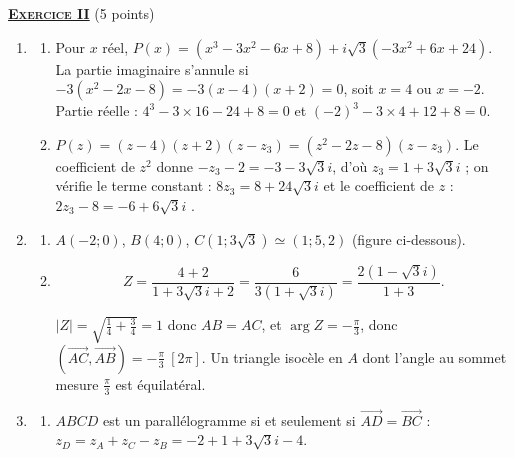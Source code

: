 \noindent \underline{\textsc{\textbf{Exercice II}}} (5 points)
	\begin{enumerate}
		\item \begin{enumerate}
			\item {}
				Pour $x$ réel,
				$P(x) = \left(x^3 - 3x^2 - 6x + 8\right) + i\sqrt{3}\left(-3x^2 + 6x + 24\right)$.
				La partie imaginaire s'annule si $-3(x^2 - 2x - 8) = -3(x-4)(x+2) = 0$, soit $x = 4$ ou $x = -2$.
				Partie réelle : $4^3 - 3\times16 - 24 + 8 = 0$ et $(-2)^3 - 3\times4 + 12 + 8 = 0$.

			\item {}
				$P(z) = (z-4)(z+2)(z - z_3) = (z^2 - 2z - 8)(z - z_3)$.
				Le coefficient de $z^2$ donne $-z_3 - 2 = -3 - 3\sqrt{3}i$, d'où $z_3 = 1 + 3\sqrt{3}i$ ;
				on vérifie le terme constant : $8z_3 = 8 + 24\sqrt{3}i$ \checkmark{} et le coefficient de $z$ :
				$2z_3 - 8 = -6 + 6\sqrt{3}i$ \checkmark.

		\end{enumerate}
		\item \begin{enumerate}
			\item {} $A(-2;0)$, $B(4;0)$, $C\left(1;3\sqrt{3}\right) \simeq (1;5{,}2)$ (figure ci-dessous).
			\item {}
				\[
					Z = \frac{4+2}{1 + 3\sqrt{3}i + 2} = \frac{6}{3\left(1 + \sqrt{3}i\right)} = \frac{2\left(1 - \sqrt{3}i\right)}{1 + 3}.
				\]


				$|Z| = \sqrt{\frac{1}{4}+\frac{3}{4}} = 1$ donc $AB = AC$, et $\arg Z = -\frac{\pi}{3}$, donc
				$\left(\overrightarrow{AC},\overrightarrow{AB}\right) = -\frac{\pi}{3}~[2\pi]$.
				Un triangle isocèle en $A$ dont l'angle au sommet mesure $\frac{\pi}{3}$ est équilatéral.

		\end{enumerate}
		\item \begin{enumerate}
			\item {}
				$ABCD$ est un parallélogramme si et seulement si $\overrightarrow{AD} = \overrightarrow{BC}$ :
				$z_D = z_A + z_C - z_B = -2 + 1 + 3\sqrt{3}i - 4$.


\end{enumerate}
\end{enumerate}
